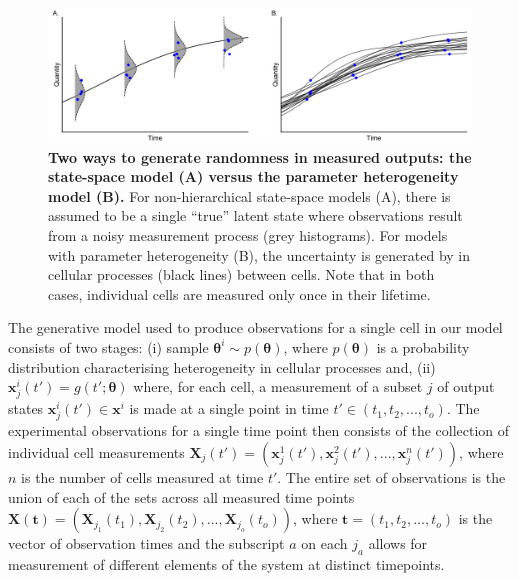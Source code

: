 \documentclass[10pt,letterpaper]{article}
\begin{document}
\begin{figure}[H]
	\centerline{\includegraphics[width=\textwidth]{../figures/data_generation.pdf}}
	\caption{\textbf{Two ways to generate randomness in measured outputs: the state-space model (A) versus the parameter heterogeneity model (B).} For non-hierarchical state-space models (A), there is assumed to be a single ``true'' latent state where observations result from a noisy measurement process (grey histograms). For models with parameter heterogeneity (B), the uncertainty is generated by in cellular processes (black lines) between cells. Note that in both cases, individual cells are measured only once in their lifetime.}
	\label{fig:data_generation}
\end{figure}

The generative model used to produce observations for a single cell in our model consists of two stages: (i) sample $\boldsymbol{\theta}^i\sim p(\boldsymbol{\theta})$, where $p(\boldsymbol{\theta})$ is a probability distribution characterising heterogeneity in cellular processes and, (ii) $\boldsymbol{x}_j^i(t') = g(t'; \boldsymbol{\theta})$ where, for each cell, a measurement of a subset $j$ of output states $\boldsymbol{x}_j^i(t')\in\boldsymbol{x}^i$ is made at a single point in time $t'\in (t_1, t_2, ..., t_o)$. The experimental observations for a single time point then consists of the collection of individual cell measurements $\boldsymbol{X}_j(t') = (\boldsymbol{x}_j^1(t'), \boldsymbol{x}_j^2(t'), ..., \boldsymbol{x}_j^n(t'))$, where $n$ is the number of cells measured at time $t'$. The entire set of observations is the union of each of the sets across all measured time points $\boldsymbol{X}(\boldsymbol{t}) = (\boldsymbol{X}_{j_1}(t_1), \boldsymbol{X}_{j_2}(t_2), ..., \boldsymbol{X}_{j_o}(t_o))$, where $\boldsymbol{t}=(t_1, t_2, ..., t_o)$ is the vector of observation times and the subscript $a$ on each $j_a$ allows for measurement of different elements of the system at distinct timepoints.
\end{document}
